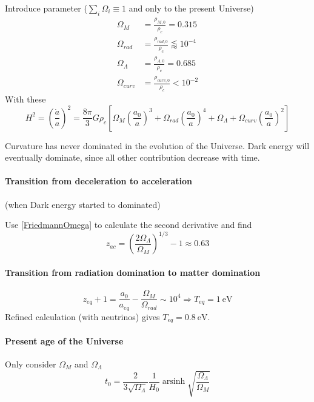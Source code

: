 \documentclass[12pt, a4paper, DIV=15]{article}
\numberwithin{equation}{section}
\DeclareMathOperator{\arsinh}{arsinh}
\begin{document}
Introduce parameter ($\sum_i \Omega_i \equiv 1$ and only to the present Universe)
\begin{align}
   \Omega_M &= \frac{\rho_{M, 0}}{\rho_c}=0.315 \\
   \Omega_{rad} &= \frac{\rho_{rad,0}}{\rho_c} \lessapprox 10^{-4} \\
   \Omega_{\Lambda} &= \frac{\rho_{\Lambda,0}}{\rho_c} = 0.685\\
   \Omega_{curv} &= \frac{\rho_{curv,0}}{\rho_c} < 10^{-2}
\end{align}
With these
\begin{equation}
   H^2 = \left( \frac{\dot{a}}{a} \right)^2 = \frac{8\pi}{3} G \rho_c \left[ \Omega_M \left( \frac{a_0}{a} \right)^3 + \Omega_{rad} \left( \frac{a_0}{a} \right)^4 + \Omega_\Lambda + \Omega_{curv} \left( \frac{a_0}{a} \right)^2 \right] \label{FriedmannOmega}
\end{equation}

Curvature has never dominated in the evolution of the Universe. Dark energy will eventually dominate, since all other contribution decrease with time.


\paragraph{Transition from deceleration to acceleration} (when Dark energy started to dominated)

Use \eqref{FriedmannOmega} to calculate the second derivative and find
\begin{equation}
   z_{ac} = \left( \frac{2 \Omega_\Lambda}{\Omega_M} \right)^{1/3} - 1 \approx 0.63
\end{equation}

\paragraph{Transition from radiation domination to matter domination}
\begin{equation}
   z_{eq} + 1 = \frac{a_0}{a_{eq}} - \frac{\Omega_M}{\Omega_{rad}} \sim 10^4 \Rightarrow T_{eq} = \SI{1}{\eV}
\end{equation}
Refined calculation (with neutrinos) gives $T_{eq} = \SI{0.8}{\eV}$.

\paragraph{Present age of the Universe}
Only consider $\Omega_M$ and $\Omega_\Lambda$
\begin{equation}
   t_0 = \frac{2}{3\sqrt{\Omega_\Lambda}} \frac{1}{H_0} \arsinh \sqrt{\frac{\Omega_\Lambda}{\Omega_M}} 
\end{equation}
\end{document}
